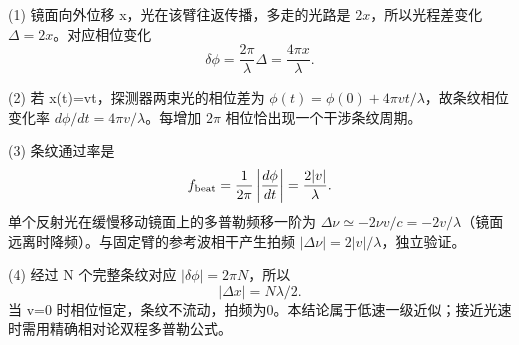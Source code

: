 (1) 镜面向外位移 x，光在该臂往返传播，多走的光路是 \(2x\)，所以光程差变化 \(\Delta=2x\)。对应相位变化
\[
\delta\phi=\frac{2\pi}{\lambda}\Delta=\frac{4\pi x}{\lambda}.
\]

(2) 若 x(t)=vt，探测器两束光的相位差为 \(\phi(t)=\phi(0)+4\pi vt/\lambda\)，故条纹相位变化率 \(d\phi/dt=4\pi v/\lambda\)。每增加 \(2\pi\) 相位恰出现一个干涉条纹周期。

(3) 条纹通过率是
\[
f_{\rm beat}=\frac1{2\pi}\left|\frac{d\phi}{dt}\right|
=\frac{2|v|}{\lambda}.
\]
单个反射光在缓慢移动镜面上的多普勒频移一阶为 \(\Delta\nu\simeq-2\nu v/c=-2v/\lambda\)（镜面远离时降频）。与固定臂的参考波相干产生拍频 \(|\Delta\nu|=2|v|/\lambda\)，独立验证。

(4) 经过 N 个完整条纹对应 \(|\delta\phi|=2\pi N\)，所以
\[
|\Delta x|=N\lambda/2.
\]
当 v=0 时相位恒定，条纹不流动，拍频为0。本结论属于低速一级近似；接近光速时需用精确相对论双程多普勒公式。
